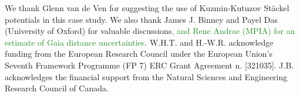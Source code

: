 \documentclass[iop,revtex4]{emulateapj}
\newcommand{\NEW}[1]{\textcolor{ForestGreen}{#1}}
\begin{document}
We thank Glenn van de Ven for suggesting the use of Kuzmin-Kutuzov St\"{a}ckel potentials in this case study. We also thank James J. Binney and Payel Das (University of Oxford) for valuable discussions\NEW{, and Rene Andrae (MPIA) for an estimate of Gaia distance uncertainties}. W.H.T. and H.-W.R. acknowledge funding from the European  Research Council under the European Union's Seventh Framework Programme (FP 7) ERC Grant Agreement n. [321035]. J.B. acknowledges the financial support from the Natural Sciences and Engineering Research Council of Canada. 

{}

\end{document}
